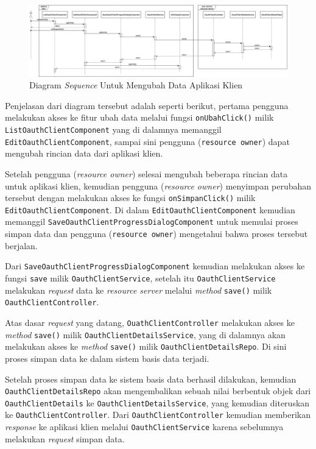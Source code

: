 \documentclass[pdftex,12pt, oneside]{article}
\begin{document}
\begin{itemize}
	\begin{figure}[H]
		\centering
		\includegraphics[width=1\textwidth]{./resources/seq-edit-client}
		\caption{Diagram \textit{Sequence} Untuk Mengubah Data Aplikasi Klien}
		\label{fig:seq-edit-client}
	\end{figure}
	
	Penjelasan dari diagram tersebut adalah seperti berikut, pertama pengguna melakukan akses ke fitur ubah data melalui fungsi \texttt{onUbahClick()} milik \texttt{ListOauthClientComponent} yang di dalamnya memanggil \texttt{EditOauthClientComponent}, sampai sini pengguna (\texttt{resource owner}) dapat mengubah rincian data dari aplikasi klien.
	
	Setelah pengguna (\textit{resource owner}) selesai mengubah beberapa rincian data untuk aplikasi klien, kemudian pengguna (\textit{resource owner}) menyimpan perubahan tersebut dengan melakukan akses ke fungsi \texttt{onSimpanClick()} milik \texttt{EditOauthClientComponent}. Di dalam \texttt{EditOauthClientComponent} kemudian memanggil \texttt{SaveOauthClientProgressDialogComponent} untuk memulai proses simpan data dan pengguna (\texttt{resource owner}) mengetahui bahwa proses tersebut berjalan.
	
	Dari \texttt{SaveOauthClientProgressDialogComponent} kemudian melakukan akses ke fungsi \texttt{save} milik \texttt{OauthClientService}, setelah itu \texttt{OauthClientService} melakukan \textit{request} data ke \textit{resource server} melalui \textit{method} \texttt{save()} milik \texttt{OauthClientController}.
	
	Atas dasar \textit{request} yang datang, \texttt{OuathClientController} melakukan akses ke \textit{method} \texttt{save()} milik \texttt{OauthClientDetailsService}, yang di dalamnya akan melakukan akses ke \textit{method} \texttt{save()} milik \texttt{OauthClientDetailsRepo}. Di sini proses simpan data ke dalam sistem basis data terjadi.
	
	Setelah proses simpan data ke sistem basis data berhasil dilakukan, kemudian \texttt{OauthClientDetailsRepo} akan mengembalikan sebuah nilai berbentuk objek dari \texttt{OauthClientDetails} ke \texttt{OauthClientDetailsService}, yang kemudian diteruskan ke \texttt{OauthClientController}. Dari \texttt{OauthClientController} kemudian memberikan \textit{response} ke aplikasi klien melalui \texttt{OauthClientService} karena sebelumnya melakukan \textit{request} simpan data.
	

\end{itemize}
\end{document}
